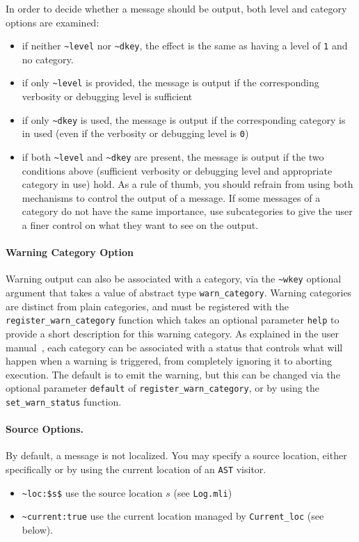 In order to decide whether a message should be output, both level and category
options are examined:
\begin{itemize}
\item if neither \lstinline|~level| nor \lstinline|~dkey|, the effect is the
  same as having a level of \lstinline|1| and no category.
\item if only \lstinline|~level| is provided, the message is output if the
  corresponding verbosity or debugging level is sufficient
\item if only \lstinline|~dkey| is used, the message is output if the
  corresponding category is in used
  (even if the verbosity or debugging level is \lstinline|0|)
\item if both \lstinline|~level| and \lstinline|~dkey| are present,
  the message is output if the two conditions above
  (sufficient verbosity or debugging level and appropriate category in use)
  hold. As a rule of thumb, you should refrain from using both mechanisms to
  control the output of a message. If some messages of a category do not have
  the same importance, use subcategories to give the user a finer control on
  what they want to see on the output.
\end{itemize}

\paragraph{Warning Category Option} Warning output can also be associated with a
category, via the \lstinline|~wkey| optional argument that takes a value of
abstract type 
\lstinline|warn_category|. Warning categories are distinct from plain
categories, and must be registered with the
\lstinline|register_warn_category| function which takes an optional parameter
\lstinline|help| to provide a short description for this warning category. As
explained in the user manual~\cite{userman}, each category can be associated
with a status that controls what will happen when a warning is triggered, from
completely ignoring it to aborting execution. The default is to emit the
warning, but this can be changed via the optional parameter \lstinline|default|
of \lstinline|register_warn_category|, or by using the
\lstinline|set_warn_status| function.

\paragraph{Source Options.} By default, a message is not localized. You may
specify a source location, either specifically or by using the current
location of an \texttt{AST} visitor.
\lstset{style=frama-c-style,language=}
\begin{itemize}
\item[] \lstinline{~loc:$s$} use the source location $s$ (see \texttt{Log.mli})
\item[] \lstinline{~current:true} use the current location
  managed by \texttt{Current\_loc} (see below).
\end{itemize}

